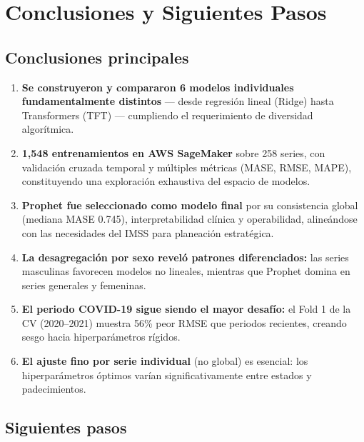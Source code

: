 \documentclass[12pt, letterpaper]{article}
\begin{document}
\newpage

\section{Conclusiones y Siguientes Pasos}\label{sec:conclusiones}

\subsection{Conclusiones principales}

\begin{enumerate}
    \item \textbf{Se construyeron y compararon 6 modelos individuales fundamentalmente distintos} — desde regresión lineal (Ridge) hasta Transformers (TFT) — cumpliendo el requerimiento de diversidad algorítmica.

    \item \textbf{1,548 entrenamientos en AWS SageMaker} sobre 258 series, con validación cruzada temporal y múltiples métricas (MASE, RMSE, MAPE), constituyendo una exploración exhaustiva del espacio de modelos.

    \item \textbf{Prophet fue seleccionado como modelo final} por su consistencia global (mediana MASE 0.745), interpretabilidad clínica y operabilidad, alineándose con las necesidades del IMSS para planeación estratégica.

    \item \textbf{La desagregación por sexo reveló patrones diferenciados:} las series masculinas favorecen modelos no lineales, mientras que Prophet domina en series generales y femeninas.

    \item \textbf{El periodo COVID-19 sigue siendo el mayor desafío:} el Fold 1 de la CV (2020--2021) muestra 56\% peor RMSE que periodos recientes, creando sesgo hacia hiperparámetros rígidos.

    \item \textbf{El ajuste fino por serie individual} (no global) es esencial: los hiperparámetros óptimos varían significativamente entre estados y padecimientos.
\end{enumerate}

\subsection{Siguientes pasos}
\end{document}
